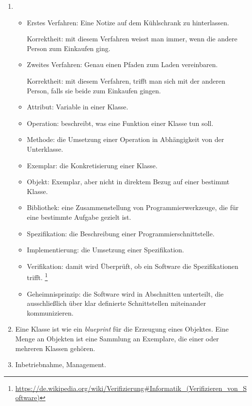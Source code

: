 \documentclass[paper=a4, english, ngerman]{scrartcl}
\begin{document}
\begin{enumerate}[label=\alph*)]
	\item \begin{itemize}
		\item Erstes Verfahren: Eine Notize auf dem Kühlschrank zu hinterlassen.
		
		Korrektheit: mit diesem Verfahren weisst man immer, wenn die andere Person zum Einkaufen ging.
		
		\item Zweites Verfahren: Genau einen Pfaden zum Laden vereinbaren.
		
		Korrektheit: mit diesem Verfahren, trifft man sich mit der anderen Person, falls sie beide zum Einkaufen gingen.
		
		
		\item Attribut: Variable in einer Klasse.
		
		\item Operation: beschreibt, was eine Funktion einer Klasse tun soll.
		
		\item Methode: die Umsetzung einer Operation in Abhängigkeit von der Unterklasse.
		
		\item Exemplar: die Konkretisierung einer Klasse.
		
		\item Objekt: Exemplar, aber nicht in direktem Bezug auf einer bestimmt Klasse.
		
		\item Bibliothek: eine Zusammenstellung von Programmierwerkzeuge, die für eine bestimmte Aufgabe gezielt ist.
		
		\item Spezifikation: die Beschreibung einer Programmierschnittstelle.
		
		\item Implementierung: die Umsetzung einer Spezifikation.
		
		\item Verifikation: damit wird Überprüft, ob ein Software die Spezifikationen trifft. \footnote{\url{https://de.wikipedia.org/wiki/Verifizierung#Informatik_(Verifizieren_von_Software)}}
		
		\item Geheimnisprinzip: die Software wird in Abschnitten unterteilt, die ausschließlich über klar definierte Schnittstellen miteinander kommunizieren.
	\end{itemize}
	
	\item Eine Klasse ist wie ein \textit{blueprint} für die Erzeugung eines Objektes.
	Eine Menge an Objekten ist eine Sammlung an Exemplare, die einer oder mehreren Klassen gehören.
	
	\item Inbetriebnahme, Management.
\end{enumerate}
		
\end{document}

